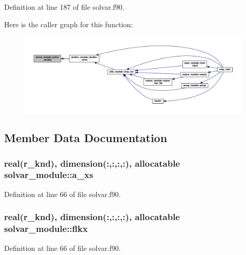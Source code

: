 Definition at line 187 of file solvar.\-f90.



Here is the caller graph for this function\-:\nopagebreak
\begin{figure}[H]
\begin{center}
\leavevmode
\includegraphics[width=350pt]{classsolvar__module_a82566cdad67c6fc8e9bc443020b1a825_icgraph}
\end{center}
\end{figure}




\subsection{Member Data Documentation}
\hypertarget{classsolvar__module_a477d603284b13595b11387b21d728dfa}{
\subsubsection[{a\-\_\-xs}]{\setlength{\rightskip}{0pt plus 5cm}real(r\-\_\-knd), dimension(\-:,\-:,\-:,\-:), allocatable solvar\-\_\-module\-::a\-\_\-xs}}\label{classsolvar__module_a477d603284b13595b11387b21d728dfa}


Definition at line 66 of file solvar.\-f90.

\hypertarget{classsolvar__module_a84eaccfc41511c5cd088f7d03d5f41c1}{
\subsubsection[{flkx}]{\setlength{\rightskip}{0pt plus 5cm}real(r\-\_\-knd), dimension(\-:,\-:,\-:,\-:), allocatable solvar\-\_\-module\-::flkx}}\label{classsolvar__module_a84eaccfc41511c5cd088f7d03d5f41c1}


Definition at line 66 of file solvar.\-f90.


